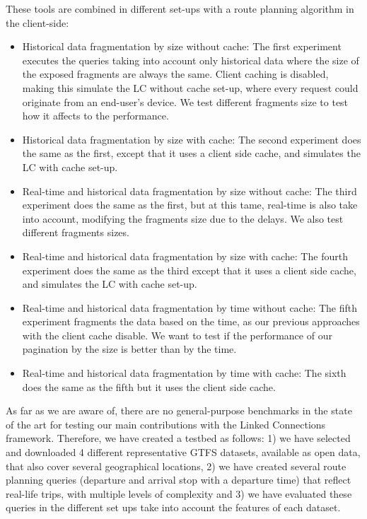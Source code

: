 \documentclass[sw]{iosart2x}
\begin{document}
These tools are combined in different set-ups with a route planning algorithm in the client-side:
\begin{itemize}
\item Historical data fragmentation by size without cache: The first experiment executes the queries taking into account only historical data where the size of the exposed fragments are always the same. Client caching is disabled, making this simulate the LC without cache set-up, where every request could originate from an end-user's device. We test different fragments size to test how it affects to the performance.
\item Historical data fragmentation by size with cache: The second experiment does the same as the first, except that it uses a client side cache, and simulates the LC with cache set-up.
\item Real-time and historical data fragmentation by size without cache: The third experiment does the same as the first, but at this tame, real-time is also take into account, modifying the fragments size due to the delays. We also test different fragments sizes.
\item Real-time and historical data fragmentation by size with cache: The fourth experiment does the same as the third except that it uses a client side cache, and simulates the LC with cache set-up.
\item Real-time and historical data fragmentation by time without cache: The fifth experiment fragments the data based on the time, as our previous approaches with the client cache disable. We want to test if the performance of our pagination by the size is better than by the time.
\item Real-time and historical data fragmentation by time with cache: The sixth does the same as the fifth but it uses the client side cache.
\end{itemize}

As far as we are aware of, there are no general-purpose benchmarks in the state of the art for testing our main contributions with the Linked Connections framework. Therefore, we have created a testbed as follows: 1) we have selected and downloaded 4 different representative GTFS datasets, available as open data, that also cover several geographical locations, 2) we have created several route planning queries (departure and arrival stop with a departure time) that reflect real-life trips, with multiple levels of complexity and 3) we have evaluated these queries in the different set ups take into account the features of each dataset.
\end{document}
